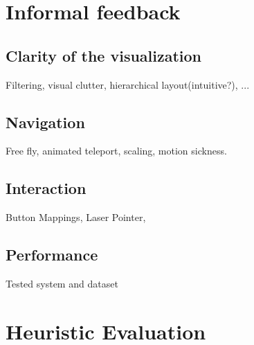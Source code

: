 \section{Informal feedback}
\label{sec:informalFeedback}

\subsection{Clarity of the visualization}
Filtering, visual clutter, hierarchical layout(intuitive?), ...

\subsection{Navigation}
Free fly, animated teleport, scaling, motion sickness.

\subsection{Interaction}
Button Mappings, Laser Pointer, 

\subsection{Performance}
Tested system and dataset

\section{Heuristic Evaluation}
\label{sec:heuristicEvaluation}